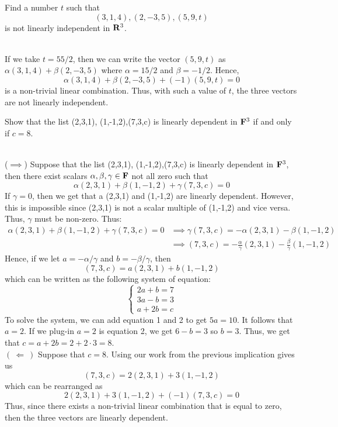 \begin{exercise}
    Find a number $t$ such that
    $$(3,1,4), (2, -3, 5), (5,9,t)$$
    is not linearly independent in $\mathbf{R}^3$.\\
\end{exercise}

\begin{solution}
    \\ If we take $t = 55/2$, then we can write the vector $(5,9,t)$ as $\alpha(3,1,4) + \beta(2, -3, 5)$ where $\alpha = 15/2$ and $\beta = -1/2$. Hence,
    $$\alpha(3,1,4) + \beta(2, -3, 5) + (-1)(5,9,t) = 0$$
    is a non-trivial linear combination. Thus, with such a value of $t$, the three vectors are not linearly independent. \\
\end{solution}

\begin{exercise}
    Show that the list (2,3,1), (1,-1,2),(7,3,c) is linearly dependent in $\mathbf{F}^3$ if and only if $c=8$. \\
\end{exercise}

\begin{solution}
    \\ ($\implies$) Suppose that the list (2,3,1), (1,-1,2),(7,3,c) is linearly dependent in $\mathbf{F}^3$, then there exist scalars $\alpha, \beta, \gamma \in \mathbf{F}$ not all zero such that
    $$\alpha(2,3,1) + \beta(1,-1,2) + \gamma(7,3,c) = 0$$
    If $\gamma = 0$, then we get that a (2,3,1) and (1,-1,2) are linearly dependent. However, this is impossible since (2,3,1) is not a scalar multiple of (1,-1,2) and vice versa. Thus, $\gamma$ must be non-zero. Thus:
    \begin{align*}
        \alpha(2,3,1) + \beta(1,-1,2) + \gamma(7,3,c) = 0 &\implies \gamma(7,3,c) = -\alpha(2,3,1) - \beta(1,-1,2) \\
        &\implies (7,3,c) = -\frac{\alpha}{\gamma}(2,3,1) - \frac{\beta}{\gamma}(1,-1,2)
    \end{align*}
    Hence, if we let $a = -\alpha/\gamma$ and $b=-\beta / \gamma$, then
    $$(7,3,c) = a(2,3,1) + b(1,-1,2)$$
    which can be written as the following system of equation:
    $$\begin{cases} 2a + b = 7 \\ 3a -b = 3 \\ a + 2b = c \end{cases}$$
    To solve the system, we can add equation 1 and 2 to get $5a = 10$. It follows that $a = 2$. If we plug-in $a=2$ is equation 2, we get $6 - b = 3$ so $b=3$. Thus, we get that $c = a + 2b = 2 + 2\cdot 3 = 8$. \\
    $( \ \Longleftarrow \ )$ Suppose that $c=8$. Using our work from the previous implication gives us 
    $$(7,3,c) = 2(2,3,1) + 3(1,-1,2)$$
    which can be rearranged as 
    $$2(2,3,1) + 3(1,-1,2) + (-1)(7,3,c) = 0$$
    Thus, since there exists a non-trivial linear combination that is equal to zero, then the three vectors are linearly dependent. \\
\end{solution}

